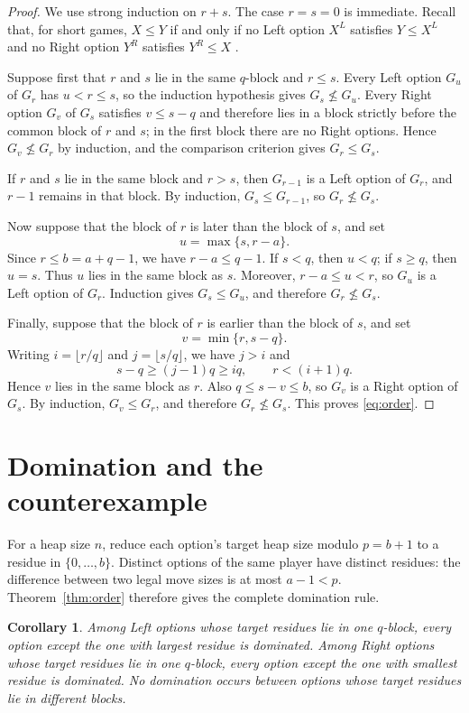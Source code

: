 \documentclass[11pt]{amsart}
\newtheorem{corollary}[theorem]{Corollary}
\begin{document}
\begin{proof}
We use strong induction on $r+s$. The case $r=s=0$ is immediate. Recall
that, for short games, $X\le Y$ if and only if no Left option $X^L$
satisfies $Y\le X^L$ and no Right option $Y^R$ satisfies $Y^R\le X$
\cite{Siegel}.

Suppose first that $r$ and $s$ lie in the same $q$-block and $r\le s$.
Every Left option $G_u$ of $G_r$ has $u<r\le s$, so the induction
hypothesis gives $G_s\nleq G_u$. Every Right option $G_v$ of $G_s$
satisfies $v\le s-q$ and therefore lies in a block strictly before the
common block of $r$ and $s$; in the first block there are no Right
options. Hence $G_v\nleq G_r$ by induction, and the comparison criterion
gives $G_r\le G_s$.

If $r$ and $s$ lie in the same block and $r>s$, then $G_{r-1}$ is a
Left option of $G_r$, and $r-1$ remains in that block. By induction,
$G_s\le G_{r-1}$, so $G_r\nleq G_s$.

Now suppose that the block of $r$ is later than the block of $s$, and
set
\[
u=\max\{s,r-a\}.
\]
Since $r\le b=a+q-1$, we have $r-a\le q-1$. If $s<q$, then $u<q$;
if $s\ge q$, then $u=s$. Thus $u$ lies in the same block as $s$.
Moreover, $r-a\le u<r$, so $G_u$ is a Left option of $G_r$. Induction
gives $G_s\le G_u$, and therefore $G_r\nleq G_s$.

Finally, suppose that the block of $r$ is earlier than the block of
$s$, and set
\[
v=\min\{r,s-q\}.
\]
Writing $i=\lfloor r/q\rfloor$ and $j=\lfloor s/q\rfloor$, we have
$j>i$ and
\[
s-q\ge(j-1)q\ge iq,
\qquad r<(i+1)q.
\]
Hence $v$ lies in the same block as $r$. Also $q\le s-v\le b$, so
$G_v$ is a Right option of $G_s$. By induction, $G_v\le G_r$, and
therefore $G_r\nleq G_s$. This proves \eqref{eq:order}.
\end{proof}

\section{Domination and the counterexample}

For a heap size $n$, reduce each option's target heap size modulo
$p=b+1$ to a residue in $\{0,\dots,b\}$. Distinct options of the same
player have distinct residues: the difference between two legal move
sizes is at most $a-1<p$. Theorem~\ref{thm:order} therefore gives the
complete domination rule.

\begin{corollary}\label{cor:domination}
Among Left options whose target residues lie in one $q$-block, every
option except the one with largest residue is dominated. Among Right
options whose target residues lie in one $q$-block, every option except
the one with smallest residue is dominated. No domination occurs
between options whose target residues lie in different blocks.
\end{corollary}
\end{document}
